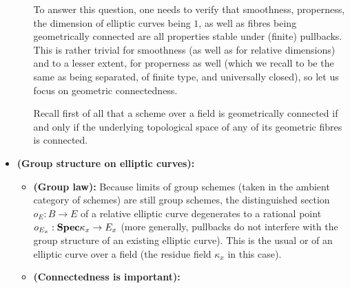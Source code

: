 \begin{remark}
\begin{itemize}
\begin{enumerate}
                                    To answer this question, one needs to verify that smoothness, properness, the dimension of elliptic curves being $1$, as well as fibres being geometrically connected are all properties stable under (finite) pullbacks. This is rather trivial for smoothness (as well as for relative dimensions) and to a lesser extent, for properness as well (which we recall to be the same as being separated, of finite type, and universally closed), so let us focus on geometric connectedness.
                                    
                                    Recall first of all that a scheme over a field is geometrically connected if and only if the underlying topological space of any of its geometric fibres is connected.
                                \end{enumerate}
                            \item \textbf{(Group structure on elliptic curves):} 
                                \begin{itemize}
                                    \item \textbf{(Group law):} Because limits of group schemes (taken in the ambient category of schemes) are still group schemes, the distinguished section $o_E: B \to E$ of a relative elliptic curve degenerates to a rational point $o_{E_x}: \mathbf{Spec} \kappa_x \to E_x$ (more generally, pullbacks do not interfere with the group structure of an existing elliptic curve). This is the usual  or  of an elliptic curve over a field (the residue field $\kappa_x$ in this case).
                                    \item \textbf{(Connectedness is important):}
                                \end{itemize}
                        \end{itemize}
                    \end{remark}
                        
